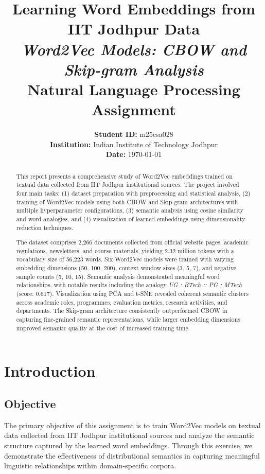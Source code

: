 \documentclass[11pt,a4paper]{report}
\title{
    \Huge \textbf{Learning Word Embeddings from IIT Jodhpur Data} \\
    \vspace{0.5cm}
    \Large \textit{Word2Vec Models: CBOW and Skip-gram Analysis} \\
    \vspace{1cm}
    \large Natural Language Processing Assignment
}
\author{
    \textbf{Student ID:} m25csa028 \\
    \textbf{Institution:} Indian Institute of Technology Jodhpur \\
    \textbf{Date:} \today
}
\date{}
\begin{document}
\maketitle

\begin{abstract}
    This report presents a comprehensive study of Word2Vec embeddings trained on textual data collected from IIT Jodhpur institutional sources. The project involved four main tasks: (1) dataset preparation with preprocessing and statistical analysis, (2) training of Word2Vec models using both CBOW and Skip-gram architectures with multiple hyperparameter configurations, (3) semantic analysis using cosine similarity and word analogies, and (4) visualization of learned embeddings using dimensionality reduction techniques.
    
    The dataset comprises 2,266 documents collected from official website pages, academic regulations, newsletters, and course materials, yielding 2.32 million tokens with a vocabulary size of 56,223 words. Six Word2Vec models were trained with varying embedding dimensions (50, 100, 200), context window sizes (3, 5, 7), and negative sample counts (5, 10, 15). Semantic analysis demonstrated meaningful word relationships, with notable results including the analogy \textit{UG : BTech :: PG : MTech} (score: 0.617). Visualization using PCA and t-SNE revealed coherent semantic clusters across academic roles, programmes, evaluation metrics, research activities, and departments. The Skip-gram architecture consistently outperformed CBOW in capturing fine-grained semantic representations, while larger embedding dimensions improved semantic quality at the cost of increased training time.
\end{abstract}

\tableofcontents

\newpage

\chapter{Introduction}

\section{Objective}
The primary objective of this assignment is to train Word2Vec models on textual data collected from IIT Jodhpur institutional sources and analyze the semantic structure captured by the learned word embeddings. Through this exercise, we demonstrate the effectiveness of distributional semantics in capturing meaningful linguistic relationships within domain-specific corpora.
\end{document}
